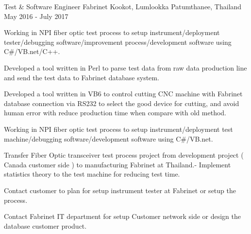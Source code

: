 \begin{cventries}
  \cventry
    {Test \& Software Engineer} %
    {Fabrinet} %
    {Kookot, Lumlookka Patumthanee, Thailand} %
    {May 2016 - July 2017} %
    {
      \begin{cvitems} %
         \item {Working in NPI fiber optic test process to setup
           instrument/deployment tester/debugging software/improvement
           process/development software using C\#/VB.net/C++.}
         \item {Developed a tool written in Perl to parse test data from raw data production line and send the test
         data to Fabrinet database system.}
         \item {Developed a tool written in VB6 to control cutting CNC machine with Fabrinet database connection via
           RS232 to select the good device for cutting, and avoid human error with reduce production time
           when compare with old method.}
         \item {Working in NPI fiber optic test process to setup instrument/deployment test machine/debugging
         software/development software using C\#/VB.net.}
         \item {Transfer Fiber Optic transceiver test process project from development project ( Canada customer
                side ) to manufacturing Fabrinet at Thailand.- Implement statistics theory to
                 the test machine for reducing test time.}
         \item {Contact customer to plan for setup instrument tester at Fabrinet or
                setup the process.}
         \item {Contact Fabrinet IT department for setup Customer network side or
                design the database customer product.}
      \end{cvitems}
    }


\end{cventries}
